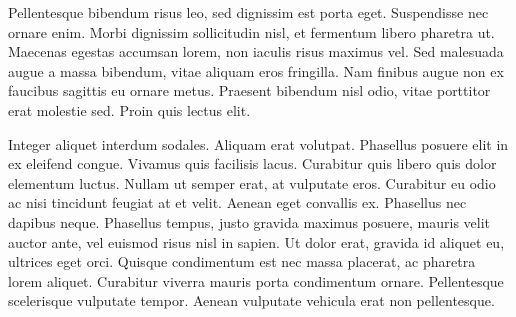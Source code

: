 Pellentesque bibendum risus leo, sed dignissim est porta eget. Suspendisse nec ornare enim. Morbi dignissim sollicitudin nisl, et fermentum libero pharetra ut. Maecenas egestas accumsan lorem, non iaculis risus maximus vel. Sed malesuada augue a massa bibendum, vitae aliquam eros fringilla. Nam finibus augue non ex faucibus sagittis eu ornare metus. Praesent bibendum nisl odio, vitae porttitor erat molestie sed. Proin quis lectus elit.

Integer aliquet interdum sodales. Aliquam erat volutpat. Phasellus posuere elit in ex eleifend congue. Vivamus quis facilisis lacus. Curabitur quis libero quis dolor elementum luctus. Nullam ut semper erat, at vulputate eros. Curabitur eu odio ac nisi tincidunt feugiat at et velit. Aenean eget convallis ex. Phasellus nec dapibus neque. Phasellus tempus, justo gravida maximus posuere, mauris velit auctor ante, vel euismod risus nisl in sapien. Ut dolor erat, gravida id aliquet eu, ultrices eget orci. Quisque condimentum est nec massa placerat, ac pharetra lorem aliquet. Curabitur viverra mauris porta condimentum ornare. Pellentesque scelerisque vulputate tempor. Aenean vulputate vehicula erat non pellentesque.